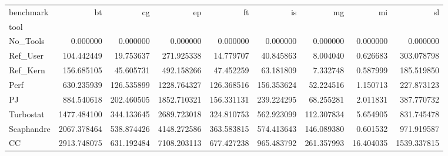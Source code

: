 \begin{tabular}{lrrrrrrrr}
\toprule
benchmark & bt & cg & ep & ft & is & mg & mi & sl \\
tool &  &  &  &  &  &  &  &  \\
\midrule
No_Tools & 0.000000 & 0.000000 & 0.000000 & 0.000000 & 0.000000 & 0.000000 & 0.000000 & 0.000000 \\
Ref_User & 104.442449 & 19.753637 & 271.925338 & 14.779707 & 40.845863 & 8.004040 & 0.626683 & 303.078798 \\
Ref_Kern & 156.685105 & 45.605731 & 492.158266 & 47.452259 & 63.181809 & 7.332748 & 0.587999 & 185.519850 \\
Perf & 630.235939 & 126.535899 & 1228.764327 & 126.368516 & 156.353624 & 52.224516 & 1.150713 & 227.873123 \\
PJ & 884.540618 & 202.460505 & 1852.710321 & 156.331131 & 239.224295 & 68.255281 & 2.011831 & 387.770732 \\
Turbostat & 1477.484100 & 344.133645 & 2689.723018 & 324.810753 & 562.923099 & 112.307834 & 5.654905 & 831.745478 \\
Scaphandre & 2067.378464 & 538.874426 & 4148.272586 & 363.583815 & 574.413643 & 146.089380 & 0.601532 & 971.919587 \\
CC & 2913.748075 & 631.192484 & 7108.203113 & 677.427238 & 965.483792 & 261.357993 & 16.404035 & 1539.337815 \\
\bottomrule
\end{tabular}
